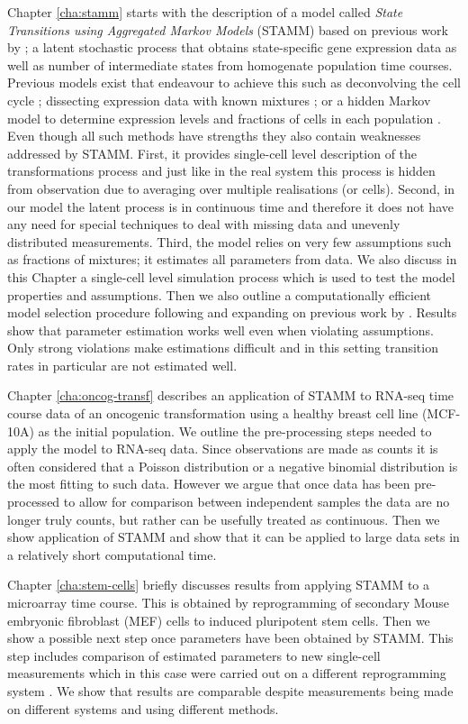 Chapter \ref{cha:stamm} starts with the description of a model called \emph{State Transitions using Aggregated Markov Models} (STAMM) based on previous work by \cite{Armond:2013}; a latent stochastic process that obtains state-specific gene expression data as well as number of intermediate states from homogenate population time courses. Previous models exist that endeavour to achieve this such as deconvolving the cell cycle \citep{Bar-Joseph04082004}; dissecting expression data with known mixtures \citep{Lahdesmaki:2005fh}; or a hidden Markov model to determine expression levels and fractions of cells in each population \citep{Roy:2006ik}. Even though all such methods have strengths they also contain weaknesses addressed by STAMM. First, it provides single-cell level description of the transformations process and just like in the real system this process is hidden from observation due to averaging over multiple realisations (or cells). Second, in our model the latent process is in continuous time and therefore it does not have any need for special techniques to deal with missing data and unevenly distributed measurements. Third, the model relies on very few assumptions such as fractions of mixtures; it estimates all parameters from data. We also discuss in this Chapter a single-cell level simulation process which is used to test the model properties and assumptions. Then we also outline a computationally efficient model selection procedure following and expanding on previous work by \cite{Armond:2013}. Results show that parameter estimation works well even when violating assumptions. Only strong violations make estimations difficult and in this setting transition rates in particular are not estimated well.

Chapter \ref{cha:oncog-transf} describes an application of STAMM to RNA-seq time course data of an oncogenic transformation using a healthy breast cell line (MCF-10A) as the initial population. We outline the pre-processing steps needed to apply the model to RNA-seq data. Since observations are made as counts it is often considered that a Poisson distribution or a negative binomial distribution is the most fitting to such data. However we argue that once data has been pre-processed to allow for comparison between independent samples the data are no longer truly counts, but rather can be usefully treated as continuous. Then we show application of STAMM and show that it can be applied to large data sets in a relatively short computational time.

Chapter \ref{cha:stem-cells} briefly discusses results from applying STAMM to a microarray time course. This is obtained by  reprogramming of secondary Mouse embryonic fibroblast (MEF) cells to induced pluripotent stem cells. Then we show a possible next step once parameters have been obtained by STAMM. This step includes comparison of estimated parameters to new single-cell measurements which in this case were carried out on a different reprogramming system \citep{Buganim:2012hp}. We show that results are comparable despite measurements being made on different systems and using different methods.

